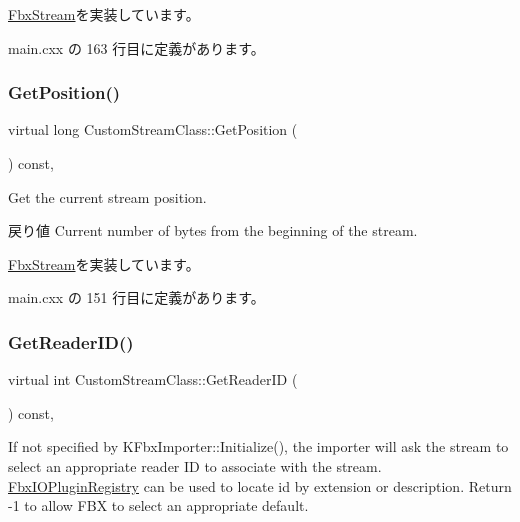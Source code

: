 \hyperlink{class_fbx_stream_adec0d602a55d05e923980e048b8d5b54}{Fbx\+Stream}を実装しています。



 main.\+cxx の 163 行目に定義があります。

\mbox{\label{class_custom_stream_class_ad8b406d43faa137290bf9527badeb27d}} 
\subsubsection{\texorpdfstring{Get\+Position()}{GetPosition()}}
{\footnotesize\ttfamily virtual long Custom\+Stream\+Class\+::\+Get\+Position (\begin{DoxyParamCaption}{ }\end{DoxyParamCaption}) const\hspace{0.3cm}{\ttfamily [inline]}, {\ttfamily [virtual]}}

Get the current stream position. \begin{DoxyReturn}{戻り値}
Current number of bytes from the beginning of the stream. 
\end{DoxyReturn}


\hyperlink{class_fbx_stream_aa63da9f62321748910acaa808322a794}{Fbx\+Stream}を実装しています。



 main.\+cxx の 151 行目に定義があります。

\mbox{\label{class_custom_stream_class_a7587c69f5f569528a3084d3919fa21f9}} 
\subsubsection{\texorpdfstring{Get\+Reader\+I\+D()}{GetReaderID()}}
{\footnotesize\ttfamily virtual int Custom\+Stream\+Class\+::\+Get\+Reader\+ID (\begin{DoxyParamCaption}{ }\end{DoxyParamCaption}) const\hspace{0.3cm}{\ttfamily [inline]}, {\ttfamily [virtual]}}

If not specified by K\+Fbx\+Importer\+::\+Initialize(), the importer will ask the stream to select an appropriate reader ID to associate with the stream. \hyperlink{class_fbx_i_o_plugin_registry}{Fbx\+I\+O\+Plugin\+Registry} can be used to locate id by extension or description. Return -\/1 to allow F\+BX to select an appropriate default. 

